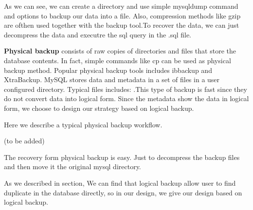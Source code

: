 


As we can see, we can create a directory and use simple mysqldump command and options to backup our data into a file. Also, compression methods like gzip are ofthen used together with the backup tool.To recover the data, we can just decompress the data and executre the sql query in the .sql file. 


\textbf{Physical backup} consists of raw copies of directories and files that store the database contents\citep{mysqlbackupdocumentation}. In fact, simple commands like cp can be used as physical backup method. Popular physical backup tools includes ibbackup and XtraBackup\citep{xtrabackup}. MySQL stores data and metadata in a set of files in a user configured directory. Typical files includes:  .This type of backup is fast since they do not convert data into logical form. Since the metadata show the data in logical form, we choose to design our strategy based on logical backup. 

Here we describe a typical physical backup workflow. 

(to be added)

The recovery form physical backup is easy. Just to decompress the backup files and then move it the original mysql directory. 




As we described in section, We can find that logical backup allow user to find duplicate in the database directly, so in our design, we give our design based on logical backup.

